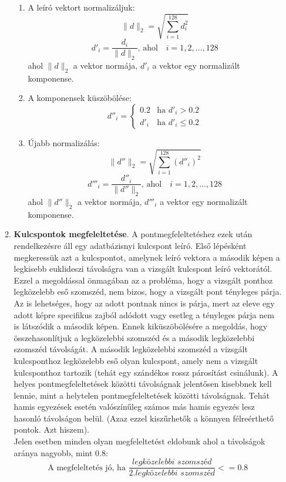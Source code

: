 \documentclass[12pt]{report}
\begin{document}
\begin{enumerate}
\begin{enumerate}
                                    \begin{enumerate}
                                        \item A leíró vektort normalizáljuk:
                                            \[\|d \|_2 = \sqrt{ \sum_{i=1}^{128} d_i^2 }\]
                                            \[d'_i = \frac{d_i}{\|d\|_2} \text{, ahol} \quad i = 1, 2, \dots, 128\]
                                            ahol $\|d \|_2$ a vektor normája, $d'_i$ a vektor egy normalizált komponense.
                                        \item A komponensek küszöbölése: 
                                            \[d''_i = \begin{cases}0.2 & \text{ha } d'_i > 0.2 \\d'_i & \text{ha } d'_i \leq 0.2\end{cases}\]
                                        \item Újabb normalizálás:
                                            \[\|d''\|_2 = \sqrt{ \sum_{i=1}^{128} (d''_i)^2 }\]
                                            \[d'''_i = \frac{d''_i}{\|d''\|_2} \text{, ahol} \quad i = 1, 2, \dots, 128\]
                                            ahol $\|d'' \|_2$ a vektor normája, $d'''_i$ a vektor egy normalizált komponense.
                                    \end{enumerate}
                                    \item \textbf{Kulcspontok megfeleltetése}. A pontmegfeleltetéshez ezek után rendelkezésre áll egy adatbázisnyi kulcspont leíró. Első lépésként megkeressük azt a kulcspontot, amelynek leíró vektora a második képen a legkisebb euklideszi távolságra van a vizsgált kulcspont leíró vektorától. Ezzel a megoldással önmagában az a probléma, hogy a vizsgált ponthoz legközelebb eső szomszéd, nem bizos, hogy a vizsgált pont tényleges párja. Az is lehetséges, hogy az adott pontnak nincs is párja, mert az eleve egy adott képre specifikus zajból adódott vagy esetleg a tényleges párja nem is látszódik a második képen. Ennek kiküszöbölésére a megoldás, hogy összehasonlítjuk a legközelebbi szomszéd és a második legközelebbi szomszéd távolságát. A második legközelebbi szomszéd a vizsgált kulcsponthoz legközelebb eső olyan kulcspont, amely nem a vizsgált kulcsponthoz tartozik (tehát egy szándékos rossz párosítást csinálunk). A helyes pontmegfeleltetések közötti távolságnak jelentősen kisebbnek kell lennie, mint a helytelen pontmegfeleltetések közötti távolságnak. Tehát hamis egyezések esetén valószínűleg számos más hamis egyezés lesz hasonló távolságon belül. (Azaz ezzel kiszűrhetők a könnyen félreérthető pontok. Azt hiszem).\\
                                    Jelen esetben minden olyan megfeleltetést eldobunk ahol a távolságok aránya nagyobb, mint 0.8:
                                    \[\text{A megfeleltetés jó, ha } \frac{\textit{legközelebbi szomszéd}}{\textit{2.legközelebbi szomszéd}} <= 0.8\]
                            \end{enumerate}


\end{enumerate}
\end{document}
